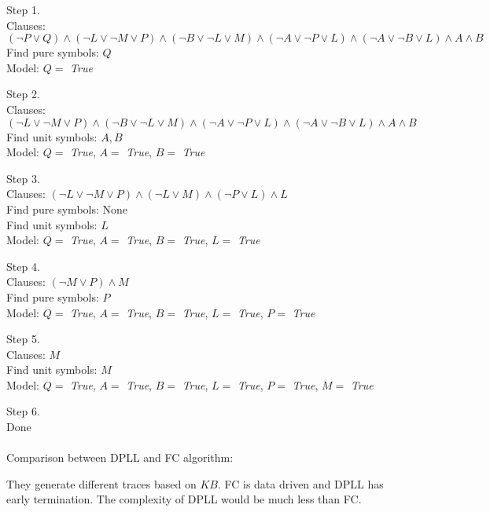 \documentclass{article}
\begin{document}
\begin{enumerate}
Step 1. \\
Clauses: $(\neg P \lor Q) \land (\neg L \lor \neg M \lor P) \land (\neg B \lor \neg L \lor M) \land (\neg A \lor \neg P \lor L) \land (\neg A \lor \neg B \lor L) \land A \land B$ \\
Find pure symbols: $Q$ \\
Model: $Q=$ \textit{True}

Step 2. \\
Clauses: $(\neg L \lor \neg M \lor P) \land (\neg B \lor \neg L \lor M) \land (\neg A \lor \neg P \lor L) \land (\neg A \lor \neg B \lor L) \land A \land B$ \\
Find unit symbols: $A,B$ \\
Model: $Q=$ \textit{True}, $A=$ \textit{True}, $B=$ \textit{True}

Step 3. \\
Clauses: $(\neg L \lor \neg M \lor P) \land (\neg L \lor M) \land (\neg P \lor L) \land L$ \\
Find pure symbols: None \\
Find unit symbols: $L$ \\
Model: $Q=$ \textit{True}, $A=$ \textit{True}, $B=$ \textit{True}, $L=$ \textit{True}

Step 4. \\
Clauses: $(\neg M \lor P) \land M$ \\
Find pure symbols: $P$ \\
Model: $Q=$ \textit{True}, $A=$ \textit{True}, $B=$ \textit{True}, $L=$ \textit{True}, $P=$ \textit{True}

Step 5. \\
Clauses: $M$ \\
Find unit symbols: $M$ \\
Model: $Q=$ \textit{True}, $A=$ \textit{True}, $B=$ \textit{True}, $L=$ \textit{True}, $P=$ \textit{True}, $M=$ \textit{True}

Step 6. \\
Done
\\
\\
Comparison between DPLL and FC algorithm:

They generate different traces based on $KB$. FC is data driven and DPLL has early termination. The complexity of DPLL would be much less than FC.


\end{enumerate}
\end{document}
